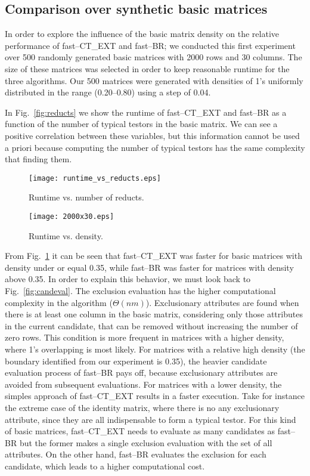 \documentclass[citeauthoryear]{llncs}
\begin{document}
%
\subsection{Comparison over synthetic basic matrices}
%
In order to explore the influence of the basic matrix density on the relative performance of fast--CT\_EXT and fast--BR; we conducted this first experiment over 500 randomly generated basic matrices with 2000 rows and 30 columns. The size of these matrices was selected in order to keep reasonable runtime for the three algorithms. Our 500 matrices were generated with densities of 1's uniformly distributed in the range (0.20--0.80) using a step of 0.04. 

In Fig.~\ref{fig:reducts} we show the runtime of fast--CT\_EXT and fast--BR as a function of the number of typical testors in the basic matrix. We can see a positive correlation between these variables, but this information cannot be used a priori because computing the number of typical testors has the same complexity that finding them.

	\begin{figure}[htb]
	    \centering
	    \begin{minipage}{.5\textwidth}
	        \centering
	        \texttt{[image: runtime\_vs\_reducts.eps]}
	        \caption{Runtime vs. number of reducts.}	   
	        \label{fig:reducts}
	    \end{minipage}%
	    \begin{minipage}{0.5\textwidth}
	        \centering
	        \texttt{[image: 2000x30.eps]}
	        \caption{Runtime vs. density.}    
	        \label{fig:density}
	    \end{minipage}
	\end{figure}

From Fig.~\ref{fig:density} it can be seen that fast--CT\_EXT was faster for basic matrices with density under or equal 0.35, while fast--BR was faster for matrices with density above 0.35. In order to explain this behavior, we must look back to Fig.~\ref{fig:candeval}. The exclusion evaluation has the higher computational complexity in the algorithm ($\Theta (nm)$). Exclusionary attributes are found when there is at least one column in the basic matrix, considering only those attributes in the current candidate, that can be removed without increasing the number of zero rows. This condition is more frequent in matrices with a higher density, where 1's overlapping is most likely. For matrices with a relative high density (the boundary identified from our experiment is 0.35), the heavier candidate evaluation process of fast--BR pays off, because exclusionary attributes are avoided from subsequent evaluations. For matrices with a lower density, the simples approach of fast--CT\_EXT results in a faster execution. Take for instance the extreme case of the identity matrix, where there is no any exclusionary attribute, since they are all indispensable to form a typical testor. For this kind of basic matrices, fast--CT\_EXT needs to evaluate as many candidates as fast--BR but the former makes a single exclusion evaluation with the set of all attributes. On the other hand, fast--BR evaluates the exclusion for each candidate, which leads to a higher computational cost.
\end{document}
